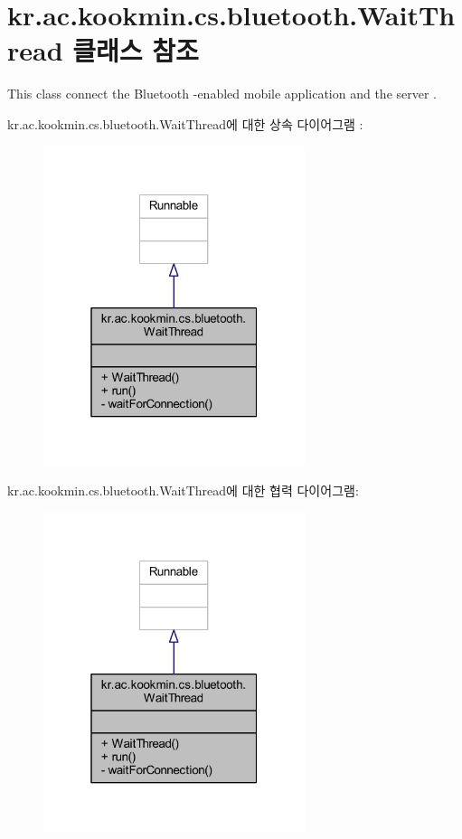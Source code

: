 \hypertarget{classkr_1_1ac_1_1kookmin_1_1cs_1_1bluetooth_1_1_wait_thread}{}\section{kr.\+ac.\+kookmin.\+cs.\+bluetooth.\+Wait\+Thread 클래스 참조}
\label{classkr_1_1ac_1_1kookmin_1_1cs_1_1bluetooth_1_1_wait_thread}


This class connect the Bluetooth -\/enabled mobile application and the server .  




kr.\+ac.\+kookmin.\+cs.\+bluetooth.\+Wait\+Thread에 대한 상속 다이어그램 \+: \nopagebreak
\begin{figure}[H]
\begin{center}
\leavevmode
\includegraphics[width=217pt]{classkr_1_1ac_1_1kookmin_1_1cs_1_1bluetooth_1_1_wait_thread__inherit__graph}
\end{center}
\end{figure}


kr.\+ac.\+kookmin.\+cs.\+bluetooth.\+Wait\+Thread에 대한 협력 다이어그램\+:\nopagebreak
\begin{figure}[H]
\begin{center}
\leavevmode
\includegraphics[width=217pt]{classkr_1_1ac_1_1kookmin_1_1cs_1_1bluetooth_1_1_wait_thread__coll__graph}
\end{center}
\end{figure}
